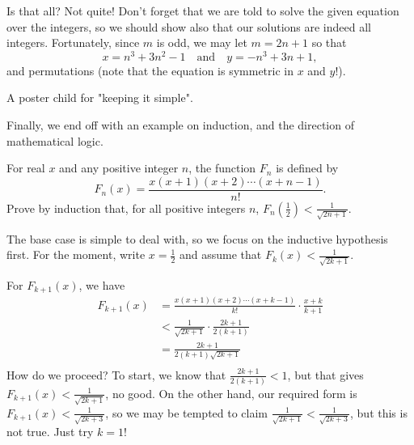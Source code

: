 \documentclass[../main.tex]{subfiles}
\begin{document}
Is that all? Not quite! Don't forget that we are told to solve the given equation over the integers, so we should show also that our solutions are indeed all integers. Fortunately, since $m$ is odd, we may let $m=2n+1$ so that
$$\boxed{x=n^3+3n^2-1\quad\text{and}\quad y=-n^3+3n+1},$$
and permutations (note that the equation is symmetric in $x$ and $y$!).
\begin{moral}
A poster child for "keeping it simple".
\end{moral}

Finally, we end off with an example on induction, and the direction of mathematical logic.
\begin{example}
For real $x$ and any positive integer $n$, the function $F_n$ is defined by
$$F_n(x)=\frac{x(x+1)(x+2)\cdots(x+n-1)}{n!}.$$
Prove by induction that, for all positive integers $n$, $F_n\left(\frac{1}{2}\right) < \frac{1}{\sqrt{2n+1}}$.
\end{example}
The base case is simple to deal with, so we focus on the inductive hypothesis first. For the moment, write $x=\frac{1}{2}$ and assume that $F_k(x)<\frac{1}{\sqrt{2k+1}}$.

For $F_{k+1}(x)$, we have
\begin{align*}
    F_{k+1}(x)&=\frac{x(x+1)(x+2)\cdots(x+k-1)}{k!} \cdot \frac{x+k}{k+1} \\
    &< \frac{1}{\sqrt{2k+1}} \cdot \frac{2k+1}{2(k+1)} \\
    &= \frac{2k+1}{2(k+1)\sqrt{2k+1}} \\
\end{align*}
How do we proceed? To start, we know that $\frac{2k+1}{2(k+1)} < 1$, but that gives $F_{k+1}(x) < \frac{1}{\sqrt{2k+1}}$, no good. On the other hand, our required form is $F_{k+1}(x) < \frac{1}{\sqrt{2k+3}}$, so we may be tempted to claim $\frac{1}{\sqrt{2k+1}} < \frac{1}{\sqrt{2k+3}}$, but this is not true. Just try $k=1$!
\end{document}
